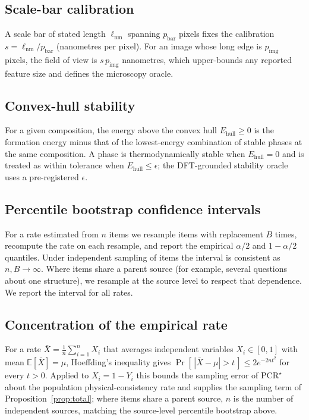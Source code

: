 \documentclass[pdflatex,sn-nature]{sn-jnl}
\begin{document}
\subsection{Scale-bar calibration}
A scale bar of stated length $\ell_{\mathrm{nm}}$ spanning $p_{\mathrm{bar}}$ pixels
fixes the calibration $s=\ell_{\mathrm{nm}}/p_{\mathrm{bar}}$ (nanometres per pixel).
For an image whose long edge is $p_{\mathrm{img}}$ pixels, the field of view is
$s\,p_{\mathrm{img}}$ nanometres, which upper-bounds any reported feature size and
defines the microscopy oracle.

\subsection{Convex-hull stability}
For a given composition, the energy above the convex hull $E_{\mathrm{hull}}\ge0$ is the
formation energy minus that of the lowest-energy combination of stable phases at the
same composition. A phase is thermodynamically stable when $E_{\mathrm{hull}}=0$ and is
treated as within tolerance when $E_{\mathrm{hull}}\le\epsilon$; the DFT-grounded
stability oracle uses a pre-registered $\epsilon$.

\subsection{Percentile bootstrap confidence intervals}
For a rate estimated from $n$ items we resample items with replacement $B$ times,
recompute the rate on each resample, and report the empirical $\alpha/2$ and
$1-\alpha/2$ quantiles. Under independent sampling of items the interval is consistent
as $n,B\to\infty$. Where items share a parent source (for example, several questions
about one structure), we resample at the source level to respect that dependence. We
report the interval for all rates.

\subsection{Concentration of the empirical rate}\label{app:concentration}
For a rate $\bar X=\frac1n\sum_{i=1}^n X_i$ that averages independent variables
$X_i\in[0,1]$ with mean $\mathbb{E}[\bar X]=\mu$, Hoeffding's inequality gives
$\Pr[\,|\bar X-\mu|>t\,]\le 2e^{-2nt^2}$ for every $t>0$. Applied to $X_i=1-Y_i$ this
bounds the sampling error of $\mathrm{PCR}^\star$ about the population physical-consistency
rate and supplies the sampling term of Proposition~\ref{prop:total}; where items share a
parent source, $n$ is the number of independent sources, matching the source-level
percentile bootstrap above.
\end{document}
